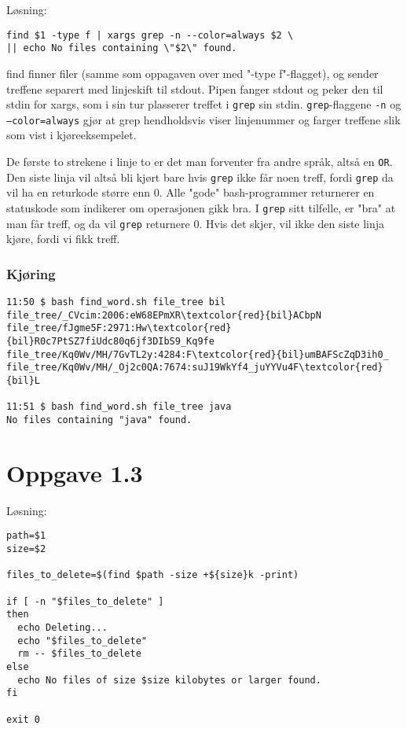 \documentclass{article}
\newcommand{\code}[1]{\colorbox{codegray}{\texttt{#1}}}
\begin{document}
Løsning: \\
\begin{verbatim}
find $1 -type f | xargs grep -n --color=always $2 \
|| echo No files containing \"$2\" found.
\end{verbatim}

find finner filer (samme som oppagaven over med "-type f"-flagget),
og sender treffene separert med linjeskift til stdout.
Pipen fanger stdout og peker den til stdin for xargs, som i sin tur
plasserer treffet i \code{grep} sin stdin. \code{grep}-flaggene
\code{-n} og \code{--color=always} gjør at grep hendholdsvis viser
linjenummer og farger treffene slik som vist i kjøreeksempelet.

De første to strekene i linje to er det man forventer fra andre språk,
altså en \code{OR}. Den siste linja vil altså bli kjørt bare hvis \code{grep}
ikke får noen treff, fordi \code{grep} da vil ha en returkode større enn 0.
Alle "gode" bash-programmer returnerer en statuskode som indikerer om operasjonen
gikk bra. I \code{grep} sitt tilfelle, er "bra" at man får treff, og da vil \code{grep}
returnere 0. Hvis det skjer, vil ikke den siste linja kjøre, fordi vi fikk treff.

\subsubsection*{Kjøring}
\begin{Verbatim}[commandchars=\\\{\}]
11:50 $ bash find_word.sh file_tree bil
file_tree/_CVcim:2006:eW68EPmXR\textcolor{red}{bil}ACbpN
file_tree/fJgme5F:2971:Hw\textcolor{red}{bil}R0c7PtSZ7fiUdc80q6jf3DIbS9_Kq9fe
file_tree/Kq0Wv/MH/7GvTL2y:4284:F\textcolor{red}{bil}umBAFScZqD3ih0_
file_tree/Kq0Wv/MH/_Oj2c0QA:7674:suJ19WkYf4_juYYVu4F\textcolor{red}{bil}L

11:51 $ bash find_word.sh file_tree java
No files containing "java" found.
\end{Verbatim}

\section*{Oppgave 1.3}

Løsning:
\begin{verbatim}
path=$1
size=$2

files_to_delete=$(find $path -size +${size}k -print)

if [ -n "$files_to_delete" ]
then
  echo Deleting...
  echo "$files_to_delete"
  rm -- $files_to_delete
else
  echo No files of size $size kilobytes or larger found.
fi

exit 0
\end{verbatim}
\end{document}
